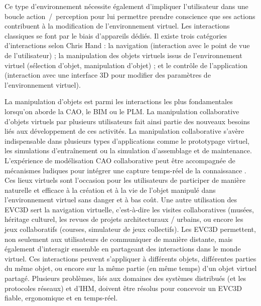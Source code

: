 Ce type d'environnement nécessite également d'impliquer l'utilisateur dans une 
boucle \og ac\-tion~/~per\-ception\fg{} pour lui permettre prendre conscience
que ses actions contribuent à la modification de l'environnement virtuel. Les 
interactions classiques se font par le biais d'appareils dédiés.
Il existe trois catégories d'interactions selon Chris Hand \cite{Hand1997}: la 
navigation (interaction avec le point de vue de l'utilisateur) ; la manipulation des 
objets virtuels issus de l'environnement virtuel (sélection d'objet, manipulation 
d'objet) ; et le contrôle de l'application (interaction avec une interface 3D pour 
modifier des paramètres de l'environnement virtuel).

La manipulation d'objets est parmi les interactions les plus fondamentales lorsqu'on 
aborde la \gls{CAO}, le \gls{BIM} ou le \gls{PLM}. La manipulation 
collaborative d'objets virtuels par plusieurs utilisateurs fait ainsi partie des nouveaux 
besoins liés aux développement de ces activités.
La manipulation collaborative s'avère indispensable dans plusieurs types 
d'applications comme le prototypage virtuel, les simulations d'entraînement ou la 
simulation d'assemblage et de maintenance. L'expérience de modélisation 
\gls{CAO} collaborative peut être accompagnée de mécanismes ludiques pour 
intégrer une capture temps-réel de la connaissance \cite{Kosmadoudi2013}.
Ces lieux virtuels sont l'occasion pour les utilisateurs de participer de manière 
naturelle et efficace à la création et à la vie de l'objet manipulé dans 
l'environnement virtuel sans danger et à bas coût. 
Une autre utilisation des \gls{EVC3D} sert la navigation virtuelle, c'est-à-dire les 
visites collaboratives (musées, héritage culturel, les revues de projets 
architecturaux / urbains, ou encore les jeux collaboratifs (courses, simulateur de 
jeux collectifs). 
Les \gls{EVC3D} permettent, non seulement aux utilisateurs de communiquer de 
manière distante, mais également d'interagir ensemble en partageant des 
interactions dans le monde virtuel. 
Ces interactions peuvent s'appliquer à différents objets, différentes parties du 
même objet, ou encore sur la même partie (en même temps) d'un objet virtuel 
partagé.
Plusieurs problèmes, liés aux domaines des systèmes distribués (et les protocoles 
réseaux) et d'IHM, doivent être résolus pour concevoir un 
\gls{EVC3D} fiable, ergonomique et en temps-réel. 




